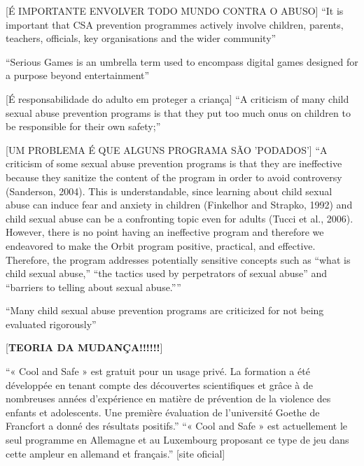[É IMPORTANTE ENVOLVER TODO MUNDO CONTRA O ABUSO]
``It is important that CSA prevention programmes actively involve children, parents, teachers, officials, key organisations and the wider community''  \cite{dip2016advancing}


``Serious Games is an umbrella term used to encompass digital games designed for a purpose beyond entertainment''\cite{dip2016advancing}


[É responsabilidade do adulto em proteger a criança]
``A criticism of many child sexual abuse prevention programs is that they put too much onus on children to be responsible for their own safety;'' \cite{dip2016advancing}

[UM PROBLEMA É QUE ALGUNS PROGRAMA SÃO 'PODADOS']
``A criticism of some sexual abuse prevention programs is that they are ineffective because they sanitize the content of the program in order to avoid controversy (Sanderson, 2004). This is understandable, since learning about child sexual abuse can induce fear and anxiety in children (Finkelhor and Strapko, 1992) and child sexual abuse can be a confronting topic even for adults (Tucci et al., 2006). However, there is no point having an ineffective program and therefore we endeavored to make the Orbit program positive, practical, and effective. Therefore, the program addresses potentially sensitive concepts such as “what is child sexual abuse,” “the tactics used by perpetrators of sexual abuse” and “barriers to telling about sexual abuse.”'' \cite{dip2016advancing}

``Many child sexual abuse prevention programs are criticized for not being evaluated rigorously''\cite{dip2016advancing}




[\textbf{TEORIA DA MUDANÇA!!!!!!}]

``« Cool and Safe » est gratuit pour un usage privé. La formation a été développée en tenant compte des découvertes scientifiques et grâce à de nombreuses années d'expérience en matière de prévention de la violence des enfants et adolescents. Une première évaluation de l'université Goethe de Francfort a donné des résultats positifs.'' ``« Cool and Safe » est actuellement le seul programme en Allemagne et au Luxembourg proposant ce type de jeu dans cette ampleur en allemand et français.'' [site oficial]

